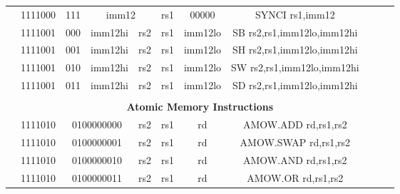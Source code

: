 \begin{table}[p]
\begin{small}
\begin{center}
\begin{tabular}{rcccccccccccl}
&
\multicolumn{1}{|c|}{1111000} &
\multicolumn{1}{c|}{111} &
\multicolumn{4}{c|}{imm12} &
\multicolumn{1}{c|}{rs1} &
\multicolumn{1}{c|}{00000} & SYNCI rs1,imm12 \\
\cline{2-9}
  

&
\multicolumn{1}{|c|}{1111001} &
\multicolumn{1}{c|}{000} &
\multicolumn{3}{c|}{imm12hi} &
\multicolumn{1}{c|}{rs2} &
\multicolumn{1}{c|}{rs1} &
\multicolumn{1}{c|}{imm12lo} & SB rs2,rs1,imm12lo,imm12hi \\
\cline{2-9}
  

&
\multicolumn{1}{|c|}{1111001} &
\multicolumn{1}{c|}{001} &
\multicolumn{3}{c|}{imm12hi} &
\multicolumn{1}{c|}{rs2} &
\multicolumn{1}{c|}{rs1} &
\multicolumn{1}{c|}{imm12lo} & SH rs2,rs1,imm12lo,imm12hi \\
\cline{2-9}
  

&
\multicolumn{1}{|c|}{1111001} &
\multicolumn{1}{c|}{010} &
\multicolumn{3}{c|}{imm12hi} &
\multicolumn{1}{c|}{rs2} &
\multicolumn{1}{c|}{rs1} &
\multicolumn{1}{c|}{imm12lo} & SW rs2,rs1,imm12lo,imm12hi \\
\cline{2-9}
  

&
\multicolumn{1}{|c|}{1111001} &
\multicolumn{1}{c|}{011} &
\multicolumn{3}{c|}{imm12hi} &
\multicolumn{1}{c|}{rs2} &
\multicolumn{1}{c|}{rs1} &
\multicolumn{1}{c|}{imm12lo} & SD rs2,rs1,imm12lo,imm12hi \\
\cline{2-9}
  

&
\multicolumn{11}{c}{} & \\
&
\multicolumn{11}{c}{\bf Atomic Memory Instructions} & \\
\cline{2-9}
  

&
\multicolumn{1}{|c|}{1111010} &
\multicolumn{4}{c|}{0100000000} &
\multicolumn{1}{c|}{rs2} &
\multicolumn{1}{c|}{rs1} &
\multicolumn{1}{c|}{rd} & AMOW.ADD rd,rs1,rs2 \\
\cline{2-9}
  

&
\multicolumn{1}{|c|}{1111010} &
\multicolumn{4}{c|}{0100000001} &
\multicolumn{1}{c|}{rs2} &
\multicolumn{1}{c|}{rs1} &
\multicolumn{1}{c|}{rd} & AMOW.SWAP rd,rs1,rs2 \\
\cline{2-9}
  

&
\multicolumn{1}{|c|}{1111010} &
\multicolumn{4}{c|}{0100000010} &
\multicolumn{1}{c|}{rs2} &
\multicolumn{1}{c|}{rs1} &
\multicolumn{1}{c|}{rd} & AMOW.AND rd,rs1,rs2 \\
\cline{2-9}
  

&
\multicolumn{1}{|c|}{1111010} &
\multicolumn{4}{c|}{0100000011} &
\multicolumn{1}{c|}{rs2} &
\multicolumn{1}{c|}{rs1} &
\multicolumn{1}{c|}{rd} & AMOW.OR rd,rs1,rs2 \\
\cline{2-9}
  


\end{tabular}
\end{center}
\end{small}
\end{table}

